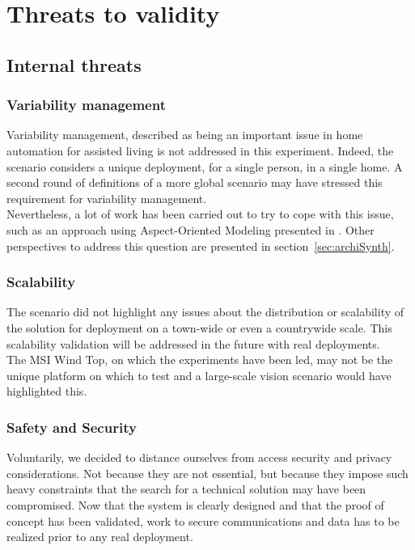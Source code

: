 \section{Threats to validity}
\label{sec:theatsToValidity}

\subsection{Internal threats}

\subsubsection{Variability management}

Variability management, described as being an important issue in home automation for assisted living is not addressed in this experiment.
Indeed, the scenario considers a unique deployment, for a single person, in a single home. A second round of definitions of a more global scenario may have stressed this requirement for variability management.\\
Nevertheless, a lot of work has been carried out to try to cope with this issue, such as an approach using Aspect-Oriented Modeling presented in \cite{Morin09a}. Other perspectives to address this question are presented in section~\ref{sec:archiSynth}.

\subsubsection{Scalability}

The scenario did not highlight any issues about the distribution or scalability of the solution for deployment on a town-wide or even a countrywide scale. 
This scalability validation will be addressed in the future with real deployments.\\
The MSI Wind Top, on which the experiments have been led, may not be the unique platform on which to test \enti{} and a large-scale vision scenario would have highlighted this.\\

\subsubsection{Safety and Security}

Voluntarily, we decided to distance ourselves from access security and privacy considerations. Not because they are not essential, but because they impose such heavy constraints that the search for a technical solution may have been compromised. Now that the system is clearly designed and that the proof of concept has been validated, work to secure communications and data has to be realized prior to any real deployment.\\

